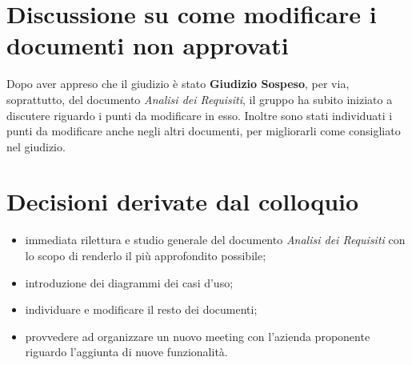 \section{Discussione su come modificare i documenti non approvati}
Dopo aver appreso che il giudizio è stato \textbf{Giudizio Sospeso}, per via, soprattutto, del documento \textit{Analisi dei Requisiti}, il gruppo ha subito iniziato a discutere riguardo i punti da modificare in esso.
Inoltre sono stati individuati i punti da modificare anche negli altri documenti, per migliorarli come consigliato nel giudizio.


\section{Decisioni derivate dal colloquio}
  \begin{itemize}
    \item immediata rilettura e studio generale del documento \textit{Analisi dei Requisiti} con lo scopo di renderlo il più approfondito possibile;
    \item introduzione dei diagrammi dei casi d'uso;
    \item individuare e modificare il resto dei documenti;
    \item provvedere ad organizzare un nuovo meeting con l'azienda proponente riguardo l'aggiunta di nuove funzionalità.
  \end{itemize}
